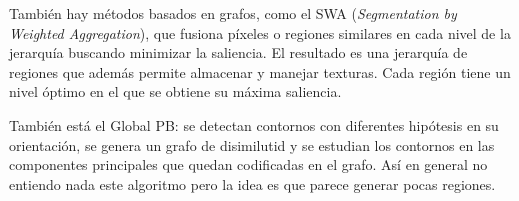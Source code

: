 \documentclass[nochap,palatino]{apuntes}
\begin{document}
También hay métodos basados en grafos, como el SWA (\textit{Segmentation by Weighted Aggregation}), que fusiona píxeles o regiones similares en cada nivel de la jerarquía buscando minimizar la saliencia. El resultado es una jerarquía de regiones que además permite almacenar y manejar texturas. Cada región tiene un nivel óptimo en el que se obtiene su máxima saliencia.

También está el Global PB: se detectan contornos con diferentes hipótesis en su orientación, se genera un grafo de disimilutid y se estudian los contornos en las componentes principales que quedan codificadas en el grafo. Así en general no entiendo nada este algoritmo pero la idea es que parece generar pocas regiones.
\end{document}
